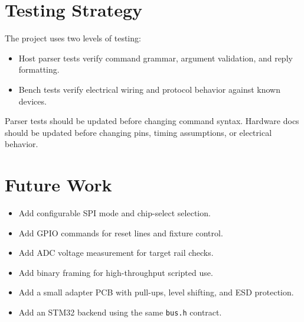 \documentclass[11pt]{article}
\begin{document}
\section{Testing Strategy}

The project uses two levels of testing:

\begin{itemize}[nosep]
  \item Host parser tests verify command grammar, argument validation, and reply formatting.
  \item Bench tests verify electrical wiring and protocol behavior against known devices.
\end{itemize}

Parser tests should be updated before changing command syntax. Hardware docs should be updated before changing pins, timing assumptions, or electrical behavior.

\section{Future Work}

\begin{itemize}[nosep]
  \item Add configurable SPI mode and chip-select selection.
  \item Add GPIO commands for reset lines and fixture control.
  \item Add ADC voltage measurement for target rail checks.
  \item Add binary framing for high-throughput scripted use.
  \item Add a small adapter PCB with pull-ups, level shifting, and ESD protection.
  \item Add an STM32 backend using the same \texttt{bus.h} contract.
\end{itemize}
\end{document}
